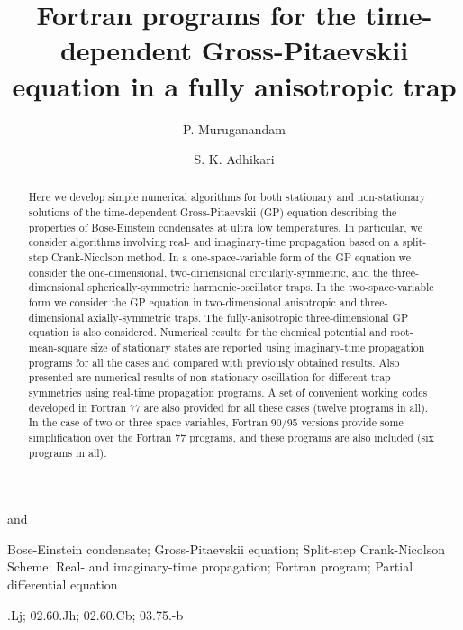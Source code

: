 \documentclass[onecolumn]{elsart3p}
\begin{document}
\begin{frontmatter}

\title{{Fortran programs for the time-dependent
Gross-Pitaevskii equation in a fully anisotropic trap}}



\author[bdu,ift]{P. Muruganandam} and
\author[ift]{S. K. Adhikari}%
\address[bdu]{School of Physics, Bharathidasan University, Palkalaiperur Campus,
Tiruchirappalli -- 620024, Tamil Nadu, India}
\address[ift]{Instituto de F\'{\i}sica Te\'{o}rica, UNESP -- S\~{a}o
Paulo State University, Barra Funda, 01.140-70 S\~{a}o Paulo, S\~{a}o Paulo, Brazil}

\begin{abstract} 

Here we develop simple numerical algorithms for both stationary and
non-stationary solutions of the time-dependent Gross-Pitaevskii (GP) equation
describing the properties of Bose-Einstein condensates at ultra low
temperatures. In particular, we consider  algorithms involving real- and
imaginary-time propagation based on a split-step Crank-Nicolson method. In a
one-space-variable form of the GP equation we consider the one-dimensional, 
two-dimensional circularly-symmetric, and the three-dimensional
spherically-symmetric harmonic-oscillator traps. In the 
two-space-variable form we consider the GP
equation in two-dimensional anisotropic  and three-dimensional axially-symmetric
traps. The fully-anisotropic three-dimensional GP equation is also considered.
Numerical results for the chemical potential and root-mean-square size of
stationary states are reported using imaginary-time propagation programs for all
the cases and compared with previously obtained results. Also presented are
numerical results of non-stationary oscillation for different trap symmetries
using real-time propagation programs. A set of convenient working codes
developed in Fortran 77  are also provided for all these cases (twelve programs
in all). In the case of two or three space variables, { Fortran
90/95 versions provide some simplification over the Fortran 77 programs}, and
these programs are also included (six programs in all). 

\end{abstract}




\begin{keyword}
Bose-Einstein condensate; Gross-Pitaevskii equation; Split-step Crank-Nicolson
Scheme; Real- and imaginary-time propagation; Fortran program; Partial
differential equation

.Lj; 02.60.Jh; 02.60.Cb; 03.75.-b
\end{keyword}

\end{frontmatter}
\end{document}
